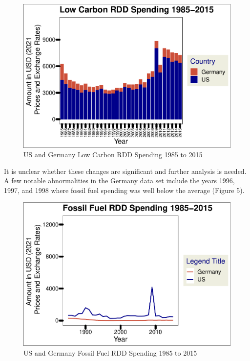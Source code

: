 \documentclass[
  12pt,
]{article}
\begin{document}
\begin{figure}
\centering
\includegraphics{Chang_Jenkins_Mullens_ENV872_Final_files/figure-latex/US and Germ Low Carbon-1.pdf}
\caption{US and Germany Low Carbon RDD Spending 1985 to 2015}
\end{figure}

\newpage

It is unclear whether these changes are significant and further analysis
is needed. A few notable abnormalities in the Germany data set include
the years 1996, 1997, and 1998 where fossil fuel spending was well below
the average (Figure 5).

\begin{figure}
\centering
\includegraphics{Chang_Jenkins_Mullens_ENV872_Final_files/figure-latex/Fossil Fuel Germ and US Line-1.pdf}
\caption{US and Germany Fossil Fuel RDD Spending 1985 to 2015}
\end{figure}
\end{document}
